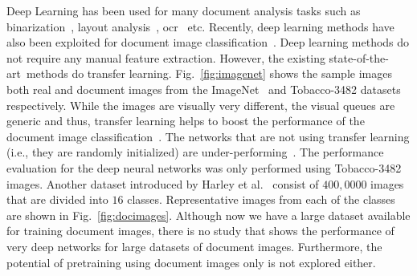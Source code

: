 \documentclass[conference]{IEEEtran}
\newcommand*{\sota}		{state-of-the-art\ }
\begin{document}
\begin{figure*}
\begin{subfigure}{.12\linewidth}
  \centering
\end{subfigure}
\begin{subfigure}{.12\linewidth}
  \centering
\end{subfigure}
\begin{subfigure}{.12\linewidth}
  \centering
\end{subfigure}
\begin{subfigure}{.12\linewidth}
  \centering
\end{subfigure}
\begin{subfigure}{.12\linewidth}
  \centering
\end{subfigure}
\caption{Sample images from the RVL-CDIP dataset. One image from each class is depicted. From left to right: \emph{Letter}, \emph{Form}, \emph{Email}, \emph{Handwritten}, \emph{Advertisement}, \emph{Scientific report}, \emph{Scientific publication}, \emph{Specification}, \emph{File folder}, \emph{News article}, \emph{Budget}, \emph{Invoice}, \emph{Presentation}, \emph{Questionnaire}, \emph{Resume}, \emph{Memo}}
\label{fig:docimages}
\end{figure*}


Deep Learning has been used for many document analysis tasks such as binarization~\cite{afzal2015documentbin, pastor2015insights}, layout analysis~\cite{pastor2016complete, seuret2017pca}, \ac{ocr}~\cite{liwicki2007novel, breuel2013high, ahmad2015scale, ahmed2016evaluation, ahmed2016generic, ul2015sequence} etc.
Recently, deep learning methods have also been exploited for document image classification~\cite{afzal2015deepdocclassifier, lekang_14_a, harley2015evaluation}.
Deep learning methods do not require any manual feature extraction.
However, the existing \sota methods do transfer learning. 
Fig.~\ref{fig:imagenet} shows the sample images both real and document images from the ImageNet~\cite{russakovsky2015imagenet} and Tobacco-3482 datasets respectively. 
While the images are visually very different, the visual queues are generic and thus, transfer learning helps to boost the performance of the document image classification~\cite{afzal2015deepdocclassifier, harley2015evaluation}.
The networks that are not using transfer learning (i.e., they are randomly initialized) are under-performing~\cite{lekang_14_a}.
The performance evaluation for the deep neural networks was only performed using Tobacco-3482 images. 
Another dataset introduced by Harley et al.~\cite{harley2015evaluation} consist of $400,0000$ images that are divided into $16$ classes. Representative images from each of the classes are shown in Fig.~\ref{fig:docimages}.
Although now we have a large dataset available for training document images, there is no study that shows the performance of very deep networks for large datasets of document images. Furthermore, the potential of pretraining using document images only is not explored either.
\end{document}
